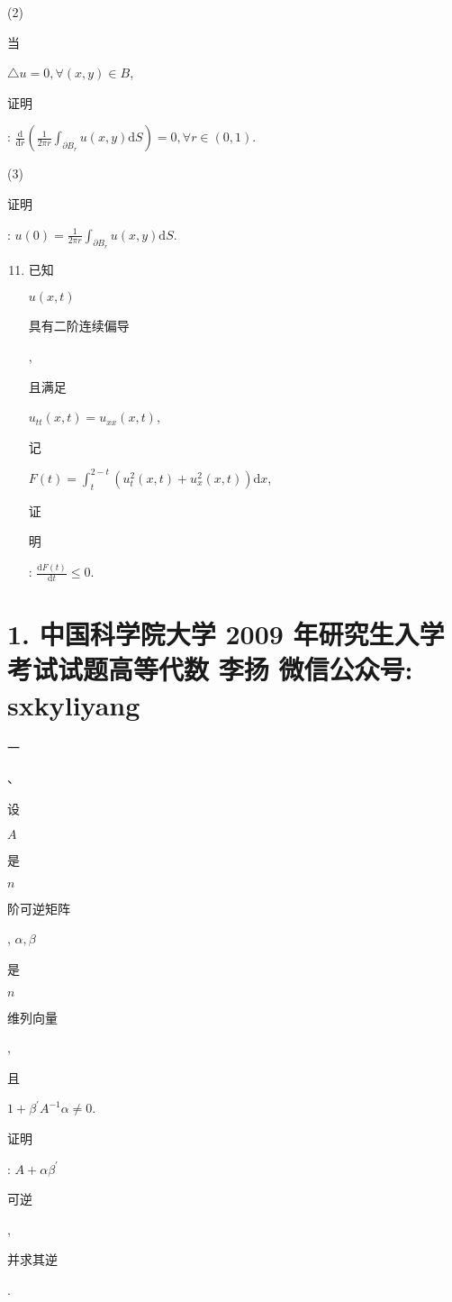 \documentclass[10pt]{article}
\begin{document}
(2) \begin{CJK}{UTF8}{mj}当\end{CJK} $\triangle u=0, \forall(x, y) \in B$, \begin{CJK}{UTF8}{mj}证明\end{CJK}: $\frac{\mathrm{d}}{\mathrm{d} r}\left(\frac{1}{2 \pi r} \int_{\partial B_{r}} u(x, y) \mathrm{d} S\right)=0, \forall r \in(0,1)$.

(3) \begin{CJK}{UTF8}{mj}证明\end{CJK}: $u(0)=\frac{1}{2 \pi r} \int_{\partial B_{r}} u(x, y) \mathrm{d} S$.

\begin{enumerate}
  \setcounter{enumi}{10}
  \item \begin{CJK}{UTF8}{mj}已知\end{CJK} $u(x, t)$ \begin{CJK}{UTF8}{mj}具有二阶连续偏导\end{CJK}, \begin{CJK}{UTF8}{mj}且满足\end{CJK} $u_{t t}(x, t)=u_{x x}(x, t)$, \begin{CJK}{UTF8}{mj}记\end{CJK} $F(t)=\int_{t}^{2-t}\left(u_{t}^{2}(x, t)+u_{x}^{2}(x, t)\right) \mathrm{d} x$, \begin{CJK}{UTF8}{mj}证\end{CJK} \begin{CJK}{UTF8}{mj}明\end{CJK}: $\frac{\mathrm{d} F(t)}{\mathrm{d} t} \leqslant 0$.
\end{enumerate}
\section{1. 中国科学院大学 2009 年研究生入学考试试题高等代数 李扬 微信公众号: sxkyliyang}
\begin{CJK}{UTF8}{mj}一\end{CJK}、\begin{CJK}{UTF8}{mj}设\end{CJK} $A$ \begin{CJK}{UTF8}{mj}是\end{CJK} $n$ \begin{CJK}{UTF8}{mj}阶可逆矩阵\end{CJK}, $\alpha, \beta$ \begin{CJK}{UTF8}{mj}是\end{CJK} $n$ \begin{CJK}{UTF8}{mj}维列向量\end{CJK}, \begin{CJK}{UTF8}{mj}且\end{CJK} $1+\beta^{\prime} A^{-1} \alpha \neq 0$. \begin{CJK}{UTF8}{mj}证明\end{CJK}: $A+\alpha \beta^{\prime}$ \begin{CJK}{UTF8}{mj}可逆\end{CJK}, \begin{CJK}{UTF8}{mj}并求其逆\end{CJK}.
\end{document}

